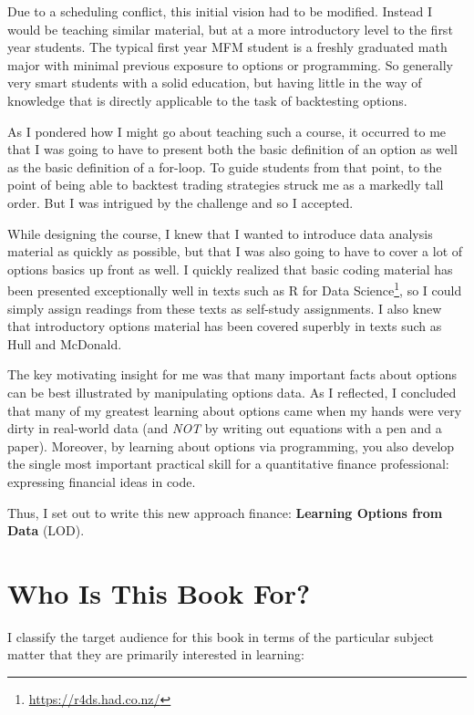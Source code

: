 \documentclass[11pt,]{krantz}
\renewcommand{\href}[2]{#2\footnote{\url{#1}}}
\begin{document}
Due to a scheduling conflict, this initial vision had to be modified. Instead I would be teaching similar material, but at a more introductory level to the first year students. The typical first year MFM student is a freshly graduated math major with minimal previous exposure to options or programming. So generally very smart students with a solid education, but having little in the way of knowledge that is directly applicable to the task of backtesting options.

As I pondered how I might go about teaching such a course, it occurred to me that I was going to have to present both the basic definition of an option as well as the basic definition of a for-loop. To guide students from that point, to the point of being able to backtest trading strategies struck me as a markedly tall order. But I was intrigued by the challenge and so I accepted.

While designing the course, I knew that I wanted to introduce data analysis material as quickly as possible, but that I was also going to have to cover a lot of options basics up front as well. I quickly realized that basic coding material has been presented exceptionally well in texts such as \href{https://r4ds.had.co.nz/}{R for Data Science}, so I could simply assign readings from these texts as self-study assignments. I also knew that introductory options material has been covered superbly in texts such as Hull and McDonald.

The key motivating insight for me was that many important facts about options can be best illustrated by manipulating options data. As I reflected, I concluded that many of my greatest learning about options came when my hands were very dirty in real-world data (and \emph{NOT} by writing out equations with a pen and a paper). Moreover, by learning about options via programming, you also develop the single most important practical skill for a quantitative finance professional: expressing financial ideas in code.

Thus, I set out to write this new approach finance: \textbf{Learning Options from Data} (LOD).

\section{Who Is This Book For?}\label{who-is-this-book-for}

I classify the target audience for this book in terms of the particular subject matter that they are primarily interested in learning:
\end{document}
